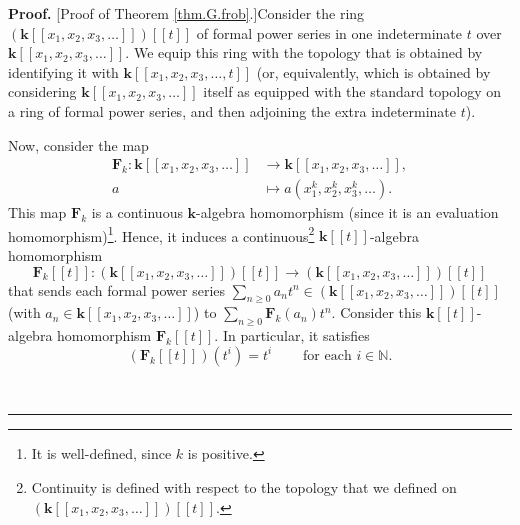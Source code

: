 \documentclass[numbers=enddot,12pt,final,onecolumn,notitlepage]{scrartcl}%
\theoremstyle{definition}
\newenvironment{proof}[1][Proof]{\noindent\textbf{#1.} }{\ \rule{0.5em}{0.5em}}
\let\sumnonlimits\sum
\renewcommand{\sum}{\sumnonlimits\limits}
\begin{document}
\begin{proof}
[Proof of Theorem \ref{thm.G.frob}.]Consider the ring $\left(  \mathbf{k}%
\left[  \left[  x_{1},x_{2},x_{3},\ldots\right]  \right]  \right)  \left[
\left[  t\right]  \right]  $ of formal power series in one indeterminate $t$
over $\mathbf{k}\left[  \left[  x_{1},x_{2},x_{3},\ldots\right]  \right]  $.
We equip this ring with the topology that is obtained by identifying it with
$\mathbf{k}\left[  \left[  x_{1},x_{2},x_{3},\ldots,t\right]  \right]  $ (or,
equivalently, which is obtained by considering $\mathbf{k}\left[  \left[
x_{1},x_{2},x_{3},\ldots\right]  \right]  $ itself as equipped with the
standard topology on a ring of formal power series, and then adjoining the
extra indeterminate $t$).

Now, consider the map%
\begin{align*}
\mathbf{F}_{k}:\mathbf{k}\left[  \left[  x_{1},x_{2},x_{3},\ldots\right]
\right]   &  \rightarrow\mathbf{k}\left[  \left[  x_{1},x_{2},x_{3}%
,\ldots\right]  \right]  ,\\
a  &  \mapsto a\left(  x_{1}^{k},x_{2}^{k},x_{3}^{k},\ldots\right)  .
\end{align*}
This map $\mathbf{F}_{k}$ is a continuous $\mathbf{k}$-algebra homomorphism
(since it is an evaluation homomorphism)\footnote{It is well-defined, since
$k$ is positive.}. Hence, it induces a continuous\footnote{Continuity is
defined with respect to the topology that we defined on $\left(
\mathbf{k}\left[  \left[  x_{1},x_{2},x_{3},\ldots\right]  \right]  \right)
\left[  \left[  t\right]  \right]  $.} $\mathbf{k}\left[  \left[  t\right]
\right]  $-algebra homomorphism%
\[
\mathbf{F}_{k}\left[  \left[  t\right]  \right]  :\left(  \mathbf{k}\left[
\left[  x_{1},x_{2},x_{3},\ldots\right]  \right]  \right)  \left[  \left[
t\right]  \right]  \rightarrow\left(  \mathbf{k}\left[  \left[  x_{1}%
,x_{2},x_{3},\ldots\right]  \right]  \right)  \left[  \left[  t\right]
\right]
\]
that sends each formal power series $\sum_{n\geq0}a_{n}t^{n}\in\left(
\mathbf{k}\left[  \left[  x_{1},x_{2},x_{3},\ldots\right]  \right]  \right)
\left[  \left[  t\right]  \right]  $ (with $a_{n}\in\mathbf{k}\left[  \left[
x_{1},x_{2},x_{3},\ldots\right]  \right]  $) to $\sum_{n\geq0}\mathbf{F}%
_{k}\left(  a_{n}\right)  t^{n}$. Consider this $\mathbf{k}\left[  \left[
t\right]  \right]  $-algebra homomorphism $\mathbf{F}_{k}\left[  \left[
t\right]  \right]  $. In particular, it satisfies
\[
\left(  \mathbf{F}_{k}\left[  \left[  t\right]  \right]  \right)  \left(
t^{i}\right)  =t^{i}\ \ \ \ \ \ \ \ \ \ \text{for each }i\in\mathbb{N}.
\]



\end{proof}
\end{document}
